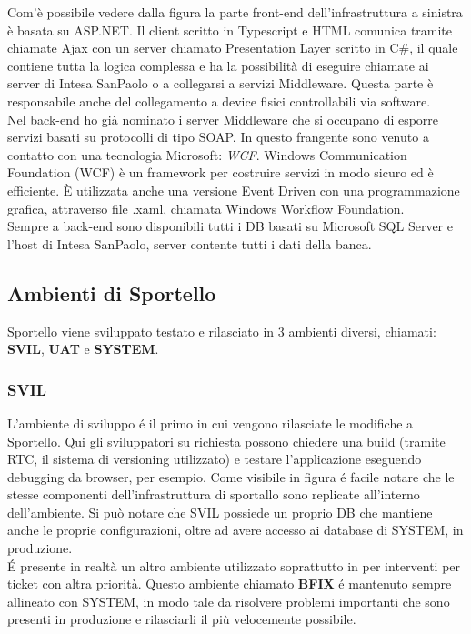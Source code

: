 Com'è possibile vedere dalla figura la parte front-end dell'infrastruttura a sinistra è basata su ASP.NET. Il client scritto in Typescript e HTML comunica tramite chiamate Ajax con un server chiamato Presentation Layer scritto in C\#, il quale contiene tutta la logica complessa e ha la possibilità di eseguire chiamate ai server di Intesa SanPaolo o a collegarsi a servizi Middleware. Questa parte è responsabile anche del collegamento a device fisici controllabili via software. \\
Nel back-end ho già nominato i server Middleware che si occupano di esporre servizi basati su protocolli di tipo SOAP. In questo frangente sono venuto a contatto con una tecnologia Microsoft: \textit{WCF}. Windows Communication Foundation (WCF) è un framework per costruire servizi in modo sicuro ed è efficiente. È utilizzata anche una versione Event Driven con una programmazione grafica, attraverso file .xaml, chiamata Windows Workflow Foundation. \\
Sempre a back-end sono disponibili tutti i DB basati su Microsoft SQL Server e l'host di Intesa SanPaolo, server contente tutti i dati della banca. 

\subsection{Ambienti di Sportello}

Sportello viene sviluppato testato e rilasciato in 3 ambienti diversi, chiamati: \textbf{SVIL}, \textbf{UAT} e \textbf{SYSTEM}.

\subsubsection{SVIL}

L'ambiente di sviluppo é il primo in cui vengono rilasciate le modifiche a Sportello. Qui gli sviluppatori su richiesta possono chiedere una build (tramite RTC, il sistema di versioning utilizzato) e testare l'applicazione eseguendo debugging da browser, per esempio. Come visibile in figura é facile notare che le stesse componenti dell'infrastruttura di sportallo sono replicate all'interno dell'ambiente. Si può notare che SVIL possiede un proprio DB che mantiene anche le proprie configurazioni, oltre ad avere accesso ai database di SYSTEM, in produzione. \\
É presente in realtà un altro ambiente utilizzato soprattutto in per interventi per ticket con altra priorità. Questo ambiente chiamato \textbf{BFIX} é mantenuto sempre allineato con SYSTEM, in modo tale da risolvere problemi importanti che sono presenti in produzione e rilasciarli il più velocemente possibile. 


